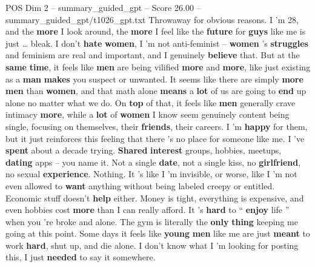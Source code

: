\begin{textsample}{POS Dim 2 – summary\_guided\_gpt – Score 26.00 – summary\_guided\_gpt/t1026\_gpt.txt}  \label{ex:f2_pos_001}
Throwaway for obvious reasons.
I ’m 28, and the \textbf{more} I look around, the \textbf{more} I feel like the \textbf{future} for \textbf{guys} like me is just … bleak.
I don't \textbf{hate} \textbf{women}, I ’m not anti-feminist – \textbf{women} ’s \textbf{struggles} and feminism are real and important, and I genuinely \textbf{believe} that.
But at the \textbf{same} \textbf{time}, it feels like \textbf{men} are being vilified \textbf{more} and \textbf{more}, like just existing as a \textbf{man} \textbf{makes} you suspect or unwanted.
It seems like there are simply \textbf{more} \textbf{men} than \textbf{women}, and that math alone \textbf{means} a \textbf{lot} of us are going to \textbf{end} up alone no matter what we do.
On \textbf{top} of that, it feels like \textbf{men} generally crave intimacy \textbf{more}, while a \textbf{lot} of \textbf{women} I know seem genuinely content being single, focusing on themselves, their \textbf{friends}, their careers.
I ’m \textbf{happy} for them, but it just reinforces this feeling that there ’s no place for someone like me.
I ’ve \textbf{spent} about a decade trying. \textbf{Shared} \textbf{interest} groups, hobbies, meetups, \textbf{dating} apps – you name it.
Not a single \textbf{date}, not a single kiss, no \textbf{girlfriend}, no sexual \textbf{experience}.
Nothing.
It ’s like I ’m invisible, or worse, like I ’m not even allowed to \textbf{want} anything without being labeled creepy or entitled.
Economic stuff doesn't \textbf{help} either.
Money is tight, everything is expensive, and even hobbies cost \textbf{more} than I can really afford.
It ’s \textbf{hard} to “ \textbf{enjoy} life ” when you ’re broke and alone.
The gym is literally the \textbf{only} \textbf{thing} keeping me going at this point.
Some days it feels like \textbf{young} \textbf{men} like me are just \textbf{meant} to work \textbf{hard}, shut up, and die alone.
I don't know what I ’m looking for posting this, I just \textbf{needed} to say it somewhere.

\end{textsample}
